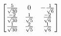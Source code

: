 \documentclass[preview]{standalone}
\begin{document}
\begin{align*}
\special{dvisvgm:raw <g id='unique000'>}\begin{bmatrix}\frac{5}{\sqrt{30}} & 0 & -\frac{1}{\sqrt{6}} \\\frac{-2}{\sqrt{30}} & \frac{1}{\sqrt{5}} & \frac{-2}{\sqrt{6}} \\\frac{1}{\sqrt{30}} & \frac{2}{\sqrt{5}} & \frac{1}{\sqrt{6}}\end{bmatrix}\special{dvisvgm:raw </g>}
\end{align*}
\end{document}
